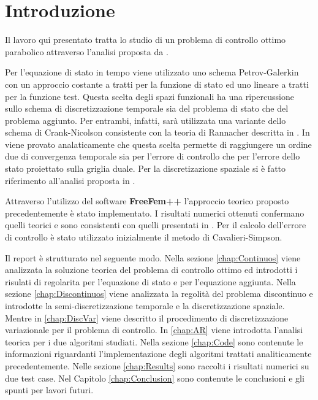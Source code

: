 \section{Introduzione}
Il lavoro qui presentato tratta lo studio di un problema di controllo ottimo parabolico attraverso l'analisi proposta da \cite{MAIN}.
\par\medskip
Per l'equazione di stato in tempo viene utilizzato uno schema Petrov-Galerkin con un approccio costante a tratti per la funzione di stato ed uno lineare a tratti per la funzione test. Questa scelta degli spazi funzionali ha una ripercussione sullo schema di discretizzazione temporale sia del problema di stato che del problema aggiunto. Per entrambi, infatti, sarà utilizzata una variante dello schema di Crank-Nicolson consistente con la teoria di Rannacher descritta in \cite{Ran84}.
In \cite{MAIN} viene provato analaticamente che questa scelta permette di raggiungere un ordine due di convergenza temporale sia per l'errore di controllo che per l'errore dello stato proiettato sulla griglia duale.
Per la discretizazione spaziale si è fatto riferimento all'analisi proposta in \cite{MV11}.
\par\medskip
Attraverso l'utilizzo del software \textbf{FreeFem++} l'approccio teorico proposto precedentemente è stato implementato. I risultati numerici ottenuti confermano quelli teorici e sono consistenti con quelli presentati in \cite{MAIN}. Per il calcolo dell'errore di controllo è stato utilizzato inizialmente il metodo di Cavalieri-Simpson. %
\par\medskip
Il report è strutturato nel seguente modo. Nella sezione \ref{chap:Continuos} viene analizzata la soluzione teorica del problema di controllo ottimo ed introdotti i risulati di regolarita per l'equazione di stato e per l'equazione aggiunta. Nella sezione \ref{chap:Discontinuos} viene analizzata la regolità del problema discontinuo e introdotte la semi-discretizzazione temporale e la discretizzazione spaziale. Mentre in \ref{chap:DiscVar} viene descritto il procedimento di discretizzazione variazionale per il problema di controllo. In \ref{chap:AR} viene introdotta l'analisi teorica per i due algoritmi studiati. Nella sezione \ref{chap:Code} sono contenute le informazioni riguardanti l'implementazione degli algoritmi trattati analiticamente precedentemente. Nelle sezione \ref{chap:Results} sono raccolti i risultati numerici su due test case. Nel Capitolo \ref{chap:Conclusion} sono contenute le conclusioni e gli spunti per lavori futuri.